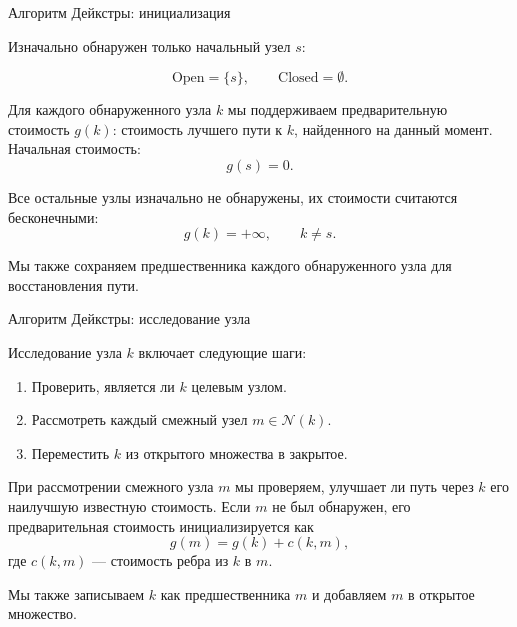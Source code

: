 \documentclass{beamer}
\begin{document}
	\begin{frame}{Алгоритм Дейкстры: инициализация}
		\begin{flushleft}
			
			Изначально обнаружен только начальный узел $s$:
			
			\[
			\text{Open}=\{s\},
			\qquad
			\text{Closed}=\emptyset.
			\]
			
			Для каждого обнаруженного узла $k$ мы поддерживаем
			предварительную стоимость $g(k)$: стоимость лучшего пути
			к $k$, найденного на данный момент. Начальная стоимость:
			\[
			g(s)=0.
			\]
			
			Все остальные узлы изначально не обнаружены, их
			стоимости считаются бесконечными:
			\[
			g(k)=+\infty,\qquad k\ne s.
			\]
			
			Мы также сохраняем предшественника каждого обнаруженного
			узла для восстановления пути.
			
		\end{flushleft}
	\end{frame}
	
	\begin{frame}{Алгоритм Дейкстры: исследование узла}
		\begin{flushleft}
			
			Исследование узла $k$ включает следующие шаги:
			
			\begin{enumerate}
				\item Проверить, является ли $k$ целевым узлом.
				\item Рассмотреть каждый смежный узел $m\in\mathcal{N}(k)$.
				\item Переместить $k$ из открытого множества в
				закрытое.
			\end{enumerate}
			
			
			\medskip
			При рассмотрении смежного узла $m$ мы проверяем,
			улучшает ли путь через $k$ его
			наилучшую известную стоимость. Если $m$ не был обнаружен, его предварительная
			стоимость инициализируется как
			\[
			g(m)=g(k)+c(k,m),
			\]
			где $c(k,m)$ — стоимость ребра из
			$k$ в $m$.
			
			Мы также записываем $k$ как предшественника $m$
			и добавляем $m$ в открытое множество.
			
		\end{flushleft}
	\end{frame}
	
\end{document}
